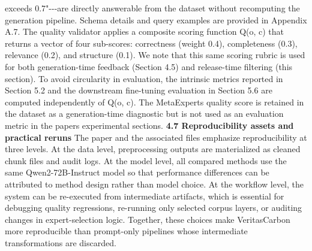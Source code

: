 \documentclass[9pt,twocolumn]{extarticle}
\begin{document}
exceeds 0.7"-\/-\/-are directly answerable from the dataset without
recomputing the generation pipeline. Schema details and query examples
are provided in Appendix A.7.
The quality validator applies a composite scoring function Q(o, c) that
returns a vector of four sub-scores: correctness (weight 0.4),
completeness (0.3), relevance (0.2), and structure (0.1). We note that
this same scoring rubric is used for both generation-time feedback
(Section 4.5) and release-time filtering (this section). To avoid
circularity in evaluation, the intrinsic metrics reported in Section 5.2
and the downstream fine-tuning evaluation in Section 5.6 are computed
independently of Q(o, c). The MetaExpert\textquotesingle s quality score
is retained in the dataset as a generation-time diagnostic but is not
used as an evaluation metric in the paper\textquotesingle s experimental
sections.
\textbf{4.7 Reproducibility assets and practical reruns}
The paper and the associated files emphasize reproducibility at three
levels. At the data level, preprocessing outputs are materialized as
cleaned chunk files and audit logs. At the model level, all compared
methods use the same Qwen2-72B-Instruct model so that performance
differences can be attributed to method design rather than model choice.
At the workflow level, the system can be re-executed from intermediate
artifacts, which is essential for debugging quality regressions,
re-running only selected corpus layers, or auditing changes in
expert-selection logic. Together, these choices make VeritasCarbon more
reproducible than prompt-only pipelines whose intermediate
transformations are discarded.
\end{document}
